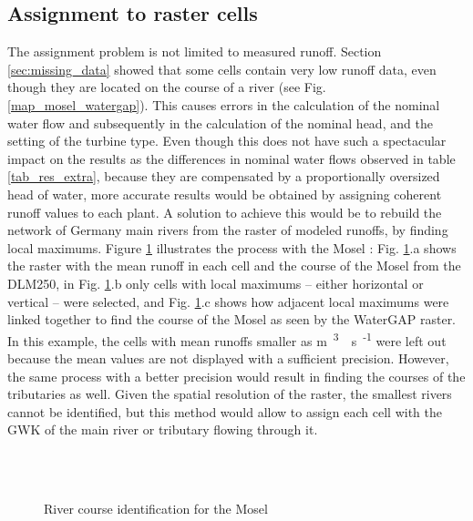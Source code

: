 \subsection{Assignment to raster cells}
\label{sub:imp_assign_cell}
The assignment problem is not limited to measured runoff. Section \ref{sec:missing_data} showed that some cells contain very low runoff data, even though they are located on the course of a river (see Fig. \ref{map_mosel_watergap}). This causes errors in the calculation of the nominal water flow and subsequently in the calculation of the nominal head, and the setting of the turbine type. Even though this does not have such a spectacular impact on the results as the differences in nominal water flows observed in table \ref{tab_res_extra}, because they are compensated by a proportionally oversized head of water, more accurate results would be obtained by assigning coherent runoff values to each plant. \newline
A solution to achieve this would be to rebuild the network of Germany main rivers from the raster of modeled runoffs, by finding local maximums. Figure \ref{imp_mosel} illustrates the process with the Mosel : Fig. \ref{imp_mosel}.a shows the raster with the mean runoff in each cell and the course of the Mosel from the DLM250, in Fig. \ref{imp_mosel}.b only cells with local maximums -- either horizontal or vertical -- were selected, and Fig. \ref{imp_mosel}.c shows how adjacent local maximums were linked together to find the course of the Mosel as seen by the WaterGAP raster. \newline
In this example, the cells with mean runoffs smaller as \unit[1]{m\textsuperscript{3}\textperiodcentered s\textsuperscript{-1}} were left out because the mean values are not displayed with a sufficient precision. However, the same process with a better precision would result in finding the courses of the tributaries as well. Given the spatial resolution of the raster, the smallest rivers cannot be identified, but this method would allow to assign each cell with the GWK of the main river or tributary flowing through it.

\begin{figure}[H]
\begin{center}
   \\
   \\
\end{center}
\caption{River course identification for the Mosel}
\label{imp_mosel}
\end{figure}

